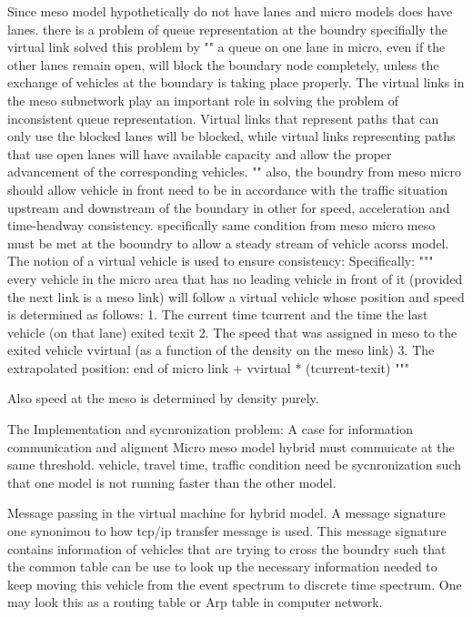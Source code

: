 \begin{bibunit}[plainnat]
Since meso model hypothetically do not have lanes and micro models does have lanes.
there is a problem of queue representation at the boundry specifially the virtual link solved this problem by 
""
 a queue on one lane in micro, even if the other lanes remain open, will
block the boundary node completely, unless the exchange of vehicles at the
boundary is taking place properly. The virtual links in the meso subnetwork play
an important role in solving the problem of inconsistent queue representation.
Virtual links that represent paths that can only use the blocked lanes will be
blocked, while virtual links representing paths that use open lanes will have
available capacity and allow the proper advancement of the corresponding vehicles.
""
also, the boundry from meso micro should allow vehicle in front need to be in accordance with the traffic situation
upstream and downstream of the boundary in other for speed, acceleration and time-headway consistency. specifically
same condition from meso micro meso must be met at the booundry to allow a steady stream of vehicle acorss model. 
The notion of a virtual vehicle is used to ensure consistency:
Specifically:
"""
every vehicle in the micro area that has no leading vehicle in front of it
(provided the next link is a meso link) will follow a virtual vehicle whose position
and speed is determined as follows:
1. The current time tcurrent and the time the last vehicle (on that lane) exited texit
2. The speed that was assigned in meso to the exited vehicle vvirtual (as a
function of the density on the meso link)
3. The extrapolated position: end of micro link + vvirtual * (tcurrent-texit)
"""

Also speed at the meso is determined by density purely. 




The Implementation and sycnronization problem: A case for information communication and aligment
Micro meso model hybrid must commuicate at the same threshold. vehicle, travel time, traffic condition need be sycnronization such that
one model is not running faster than the other model. 

Message passing in the virtual machine for hybrid model. A message signature one synonimou to how tcp/ip transfer message is used. 
This message signature contains information of vehicles that are trying to cross the boundry such that the common table can be use to look up the necessary information needed to 
keep moving this vehicle from the event spectrum to discrete time spectrum. One may look this as a routing table or Arp table in computer network. 


\end{bibunit}
